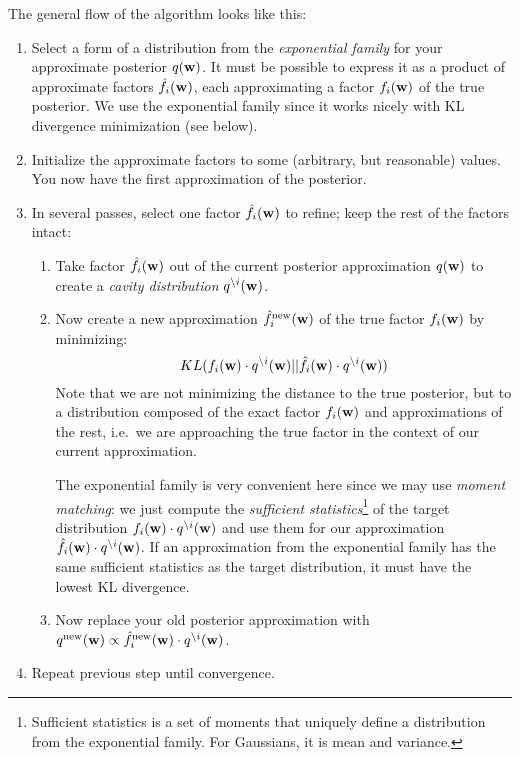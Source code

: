 \documentclass[10pt,a4paper,notitlepage]{article}
\begin{document}
The general flow of the algorithm looks like this:
\begin{enumerate}
  \item Select a form of a distribution from the \emph{exponential family} for your approximate posterior $q(\mathbf{w})$. It must be possible to express it as a product of approximate factors $\hat{f}_i(\mathbf{w})$, each approximating a factor $f_i(\mathbf{w})$ of the true posterior. We use the exponential family since it works nicely with KL divergence minimization (see below).
  \item Initialize the approximate factors to some (arbitrary, but reasonable) values. You now have the first approximation of the posterior.
  \item In several passes, select one factor $\hat{f}_i(\mathbf{w})$ to refine; keep the rest of the factors intact:
  \begin{enumerate} 
    \item Take factor $\hat{f}_i(\mathbf{w})$ out of the current posterior approximation $q(\mathbf{w})$ to create a \emph{cavity distribution} $q^{\setminus i}(\mathbf{w})$.
    \item Now create a new approximation $\hat{f}_i^{\mathrm{new}}(\mathbf{w})$ of the true factor $f_i(\mathbf{w})$ by minimizing: 
\begin{equation}\label{eq:minim_kl}
KL(f_i(\mathbf{w})\cdot q^{\setminus i}(\mathbf{w})||\hat{f}_i(\mathbf{w})\cdot q^{\setminus i}(\mathbf{w}))
\end{equation} 
Note that we are not minimizing the distance to the true posterior, but to a distribution composed of the exact factor $f_i(\mathbf{w})$ and approximations of the rest, i.e.\ we are approaching the true factor in the context of our current approximation.

The exponential family is very convenient here since we may use \emph{moment matching}: we just compute the \emph{sufficient statistics}\footnote{Sufficient statistics is a set of moments that uniquely define a distribution from the exponential family. For Gaussians, it is mean and variance.} of the target distribution $f_i(\mathbf{w})\cdot q^{\setminus i}(\mathbf{w})$ and use them for our approximation $\hat{f}_i(\mathbf{w})\cdot q^{\setminus i}(\mathbf{w})$. If an approximation from the exponential family has the same sufficient statistics as the target distribution, it must have the lowest KL divergence. 
    \item Now replace your old posterior approximation with $q^{\mathrm{new}}(\mathbf{w}) \propto \hat{f}_i^{\mathrm{new}}(\mathbf{w})\cdot q^{\setminus i}(\mathbf{w})$.
  \end{enumerate}
  \item Repeat previous step until convergence.
\end{enumerate}
\end{document}
